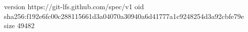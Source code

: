 version https://git-lfs.github.com/spec/v1
oid sha256:f192e6fc00c288115661d3a04070a30940a6d41777a1c9248254d3a92cbfe79e
size 49482
